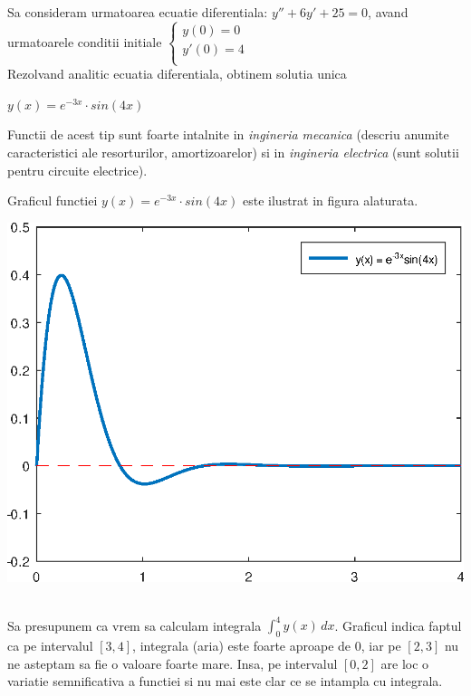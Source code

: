 \documentclass{article}
\begin{document}
\vspace{0.5cm}\begin{minipage}{0.8\textwidth}
    \tabto{0.5cm} Sa consideram urmatoarea ecuatie diferentiala:
    $y'' + 6y' + 25 = 0$, avand urmatoarele conditii initiale
    $\begin{cases}
        y(0) = 0 \\
        y'(0) = 4 \\
    \end{cases}$ \\
    
    \tabto{0.5cm} Rezolvand analitic ecuatia diferentiala, obtinem solutia unica 
    
    $y(x) = e^{-3x} \cdot sin(4x)$ 
    
    \tabto{0.5cm} Functii de acest tip sunt foarte intalnite in \textit{ingineria mecanica} (descriu anumite caracteristici ale resorturilor, amortizoarelor) si in \textit{ingineria electrica} (sunt solutii pentru circuite electrice).
    
    \tabto{0.5cm} Graficul functiei $y(x) = e^{-3x} \cdot sin(4x)$  este ilustrat in figura alaturata.
\end{minipage}
\begin{minipage}{0.25\textwidth}
    \includegraphics[scale=0.45]{fct_cuad_ad}
\end{minipage} \\

\tabto{0.5cm} Sa presupunem ca vrem sa calculam integrala $\int_0^4 y(x)\, dx$. Graficul indica faptul ca pe intervalul $[3,4]$, integrala (aria) este foarte aproape de $0$, iar pe $[2,3]$ nu ne asteptam sa fie o valoare foarte mare.
Insa, pe intervalul $[0,2]$ are loc o variatie semnificativa a functiei si nu mai este clar ce se intampla cu integrala.
\end{document}
